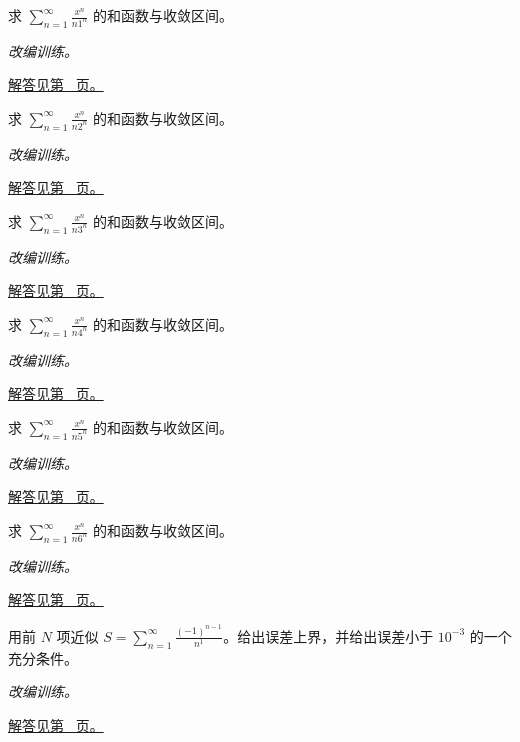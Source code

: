 \documentclass[12pt,fontset=fandol]{ctexart}
\begin{document}
\begin{example}[对数和函数与端点]\label{ex:c26q14}
求 $\displaystyle\sum_{n=1}^\infty\frac{x^n}{n1^n}$ 的和函数与收敛区间。
\par\textit{改编训练。}\par\hyperref[ans:c26q14]{解答见第~\pageref{ans:c26q14} 页。}
\end{example}
\begin{example}[对数和函数与端点]\label{ex:c26q15}
求 $\displaystyle\sum_{n=1}^\infty\frac{x^n}{n2^n}$ 的和函数与收敛区间。
\par\textit{改编训练。}\par\hyperref[ans:c26q15]{解答见第~\pageref{ans:c26q15} 页。}
\end{example}
\begin{example}[对数和函数与端点]\label{ex:c26q16}
求 $\displaystyle\sum_{n=1}^\infty\frac{x^n}{n3^n}$ 的和函数与收敛区间。
\par\textit{改编训练。}\par\hyperref[ans:c26q16]{解答见第~\pageref{ans:c26q16} 页。}
\end{example}
\begin{example}[对数和函数与端点]\label{ex:c26q17}
求 $\displaystyle\sum_{n=1}^\infty\frac{x^n}{n4^n}$ 的和函数与收敛区间。
\par\textit{改编训练。}\par\hyperref[ans:c26q17]{解答见第~\pageref{ans:c26q17} 页。}
\end{example}
\begin{example}[对数和函数与端点]\label{ex:c26q18}
求 $\displaystyle\sum_{n=1}^\infty\frac{x^n}{n5^n}$ 的和函数与收敛区间。
\par\textit{改编训练。}\par\hyperref[ans:c26q18]{解答见第~\pageref{ans:c26q18} 页。}
\end{example}
\begin{example}[对数和函数与端点]\label{ex:c26q19}
求 $\displaystyle\sum_{n=1}^\infty\frac{x^n}{n6^n}$ 的和函数与收敛区间。
\par\textit{改编训练。}\par\hyperref[ans:c26q19]{解答见第~\pageref{ans:c26q19} 页。}
\end{example}
\begin{example}[交错级数的误差控制]\label{ex:c26q20}
用前 $N$ 项近似 $\displaystyle S=\sum_{n=1}^\infty\frac{(-1)^{n-1}}{n^{1}}$。给出误差上界，并给出误差小于 $10^{-3}$ 的一个充分条件。
\par\textit{改编训练。}\par\hyperref[ans:c26q20]{解答见第~\pageref{ans:c26q20} 页。}
\end{example}
\end{document}
